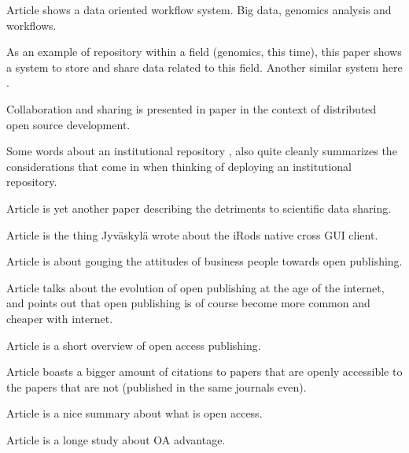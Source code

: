 Article \cite{DBLP:conf/bcb/PiredduLSZ14} shows a data oriented workflow
system. Big data, genomics analysis and workflows.

As an example of repository within a field (genomics, this time), this paper
\cite{craigon2004nascarrays} shows a system to store and share data related
to this field. Another similar system here \cite{DBLP:journals/nar/EdgarDL03}.

Collaboration and sharing is presented in paper \cite{craigon2004nascarrays} in
the context of distributed open source development.

Some words about an institutional repository \cite{gibbons2009benefits}, also
quite cleanly summarizes the considerations that come in when thinking of
deploying an institutional repository.

Article \cite{DBLP:conf/icegov/SayogoP11} is yet another paper describing
the detriments to scientific data sharing.

Article \cite{irodsinproceedings} is the thing Jyväskylä wrote about the iRods
native cross GUI client.

Article \cite{DBLP:conf/elpub/Hedlund08} is about gouging the attitudes of
business people towards open publishing.

Article \cite{laakso2011development} talks about the evolution of open
publishing at the age of the internet, and points out that open publishing
is of course become more common and cheaper with internet.

Article \cite{suber2007open} is a short overview of open access publishing.

Article \cite{harnad2004comparing} boasts a bigger amount of citations to
papers that are openly accessible to the papers that are not (published in the
same journals even).

Article \cite{bailey2008open} is a nice summary about what is open access.

Article \cite{DBLP:journals/corr/abs-cs-0606079} is a longe study about OA
advantage.

\fi

